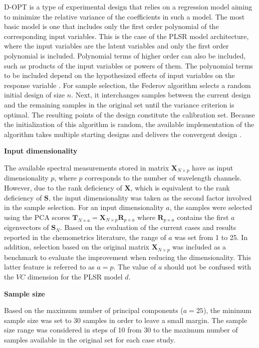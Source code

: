\documentclass[preprint,12pt]{elsarticle}
\begin{document}
D-OPT is a type of experimental design that relies on a regression model aiming to minimize the relative variance of the coefficients in such a model\cite{Goos2011}. The most basic model is one that includes only the first order polynomial of the corresponding input variables. This is the case of the PLSR model architecture, where the input variables are the latent variables and only the first order polynomial is included. Polynomial terms of higher order can also be included, such as products of the input variables or powers of them. The polynomial terms to be included depend on the hypothesized effects of input variables on the response variable \cite{Goos2011}. For sample selection, the Federov algorithm selects a random initial design of size $n$. Next, it interchanges samples between the current design and the remaining samples in the original set until the variance criterion is optimal. The resulting points of the design constitute the calibration set. Because the initialization of this algorithm is random, the available implementation of the algorithm takes multiple starting designs and delivers the convergent design \cite{Wheeler2019}.


\textbf{Input dimensionality}

The available spectral measurements stored in matrix $\mathbf{X}_{N\times p}$ have as input dimensionality $p$, where $p$ corresponds to the number of wavelength channels. However, due to the rank deficiency of $\mathbf{X}$, which is equivalent to the rank deficiency of $\mathbf{S}$, the input dimensionality was taken as the second factor involved in the sample selection. For an input dimensionality $a$, the samples were selected using the PCA scores $\mathbf{T}_{N\times a} = \mathbf{X}_{N\times p}\mathbf{R}_{p\times a}$ where $\mathbf{R}_{p\times a}$ contains the first $a$ eigenvectors of $\mathbf{S}_N$. Based on the evaluation of the current cases and results reported in the chemometrics literature, the range of $a$ was set from 1 to 25. In addition, selection based on the original matrix $\mathbf{X}_{N\times p}$ was included as a benchmark to evaluate the improvement when reducing the dimensionality. This latter feature is referred to as $a=p$. The value of $a$ should not be confused with the $VC$ dimension for the PLSR model $d$. 

\textbf{Sample size}

Based on the maximum number of principal components ($a=25$), the minimum sample size was set to 30 samples in order to leave a small margin. The sample size range was considered in steps of 10 from 30 to the maximum number of samples available in the original set for each case study. 
\end{document}
